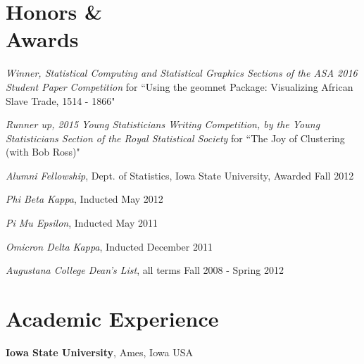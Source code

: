 \documentclass[margin,line]{res}
\begin{document}
\begin{resume}
\section{\sc Honors \& \\Awards} 
\begin{description}[leftmargin=1em]
\setlength\itemsep{-1em}
\item \textit{Winner, Statistical Computing and Statistical Graphics Sections of the ASA 2016 Student Paper Competition} for ``Using the geomnet Package: Visualizing African Slave Trade, 1514 - 
1866"\\
\item \textit{Runner up, 2015 Young Statisticians Writing Competition, by the Young Statisticians Section of the Royal Statistical Society} for ``The Joy of Clustering (with Bob Ross)"\\
\item \textit{Alumni Fellowship}, Dept. of Statistics, Iowa State University, Awarded Fall 2012\\
\item \textit{Phi Beta Kappa}, Inducted May 2012\\
\item \textit{Pi Mu Epsilon}, Inducted May 2011\\
\item \textit{Omicron Delta Kappa}, Inducted December 2011\\
\item \textit{Augustana College Dean's List}, all terms Fall 2008 - Spring 2012\\
\end{description}

\vspace{-.3cm}

%

\section{\sc Academic Experience}
{\bf Iowa State University}, Ames, Iowa USA

\vspace{-.3cm}


\end{resume}
\end{document}
